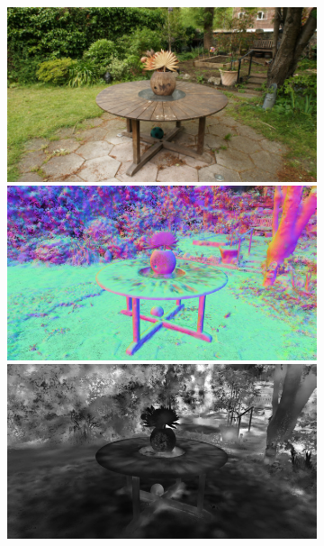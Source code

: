 \begin{figure}[tb]
\begin{subfigure}{0.155\linewidth}
  \includegraphics[width=\linewidth]{images/renders/garden_rgb_31.jpg}
  \includegraphics[width=\linewidth]{images/normals/garden_normals_31bis.jpg}
  \includegraphics[width=\linewidth]{images/frosting_size/garden_size_31bis.jpg}
  \end{subfigure}
  \hfill
  \begin{subfigure}{0.155\linewidth}

\end{subfigure}
\end{figure}
